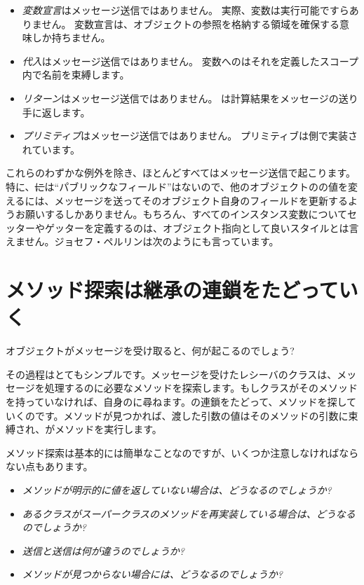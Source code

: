 \documentclass[a4paper,10pt,twoside]{book}
\begin{document}
\begin{itemize}
  \item \emph{変数宣言}はメッセージ送信ではありません。
		実際、変数は実行可能ですらありません。
		変数宣言は、オブジェクトの参照を格納する領域を確保する意味しか持ちません。
  \item \emph{代入}はメッセージ送信ではありません。
		変数へのはそれを定義したスコープ内で名前を束縛します。
  \item \emph{リターン}はメッセージ送信ではありません。
		は計算結果をメッセージの送り手に返します。
  \item \emph{プリミティブ}はメッセージ送信ではありません。
		プリミティブは側で実装されています。
\end{itemize}

これらのわずかな例外を除き、ほとんどすべてはメッセージ送信で起こります。特に、\st には``パブリックなフィールド''はないので、他のオブジェクトのの値を変えるには、メッセージを送ってそのオブジェクト自身のフィールドを更新するようお願いするしかありません。もちろん、すべてのインスタンス変数についてセッターやゲッターを定義するのは、オブジェクト指向として良いスタイルとは言えません。ジョセフ・ペルリンは次のようにも言っています。



\section{メソッド探索は継承の連鎖をたどっていく}


オブジェクトがメッセージを受け取ると、何が起こるのでしょう?

その過程はとてもシンプルです。メッセージを受けたレシーバのクラスは、メッセージを処理するのに必要なメソッドを探索します。もしクラスがそのメソッドを持っていなければ、自身のに尋ねます。の連鎖をたどって、メソッドを探していくのです。メソッドが見つかれば、渡した引数の値はそのメソッドの引数に束縛され、がメソッドを実行します。

メソッド探索は基本的には簡単なことなのですが、いくつか注意しなければならない点もあります。

\begin{itemize}
  \item \emph{メソッドが明示的に値を返していない場合は、どうなるのでしょうか?}
  \item \emph{あるクラスがスーパークラスのメソッドを再実装している場合は、どうなるのでしょうか?}
  \item \emph{送信と送信は何が違うのでしょうか?}
  \item \emph{メソッドが見つからない場合には、どうなるのでしょうか?}
\end{itemize}
\end{document}
